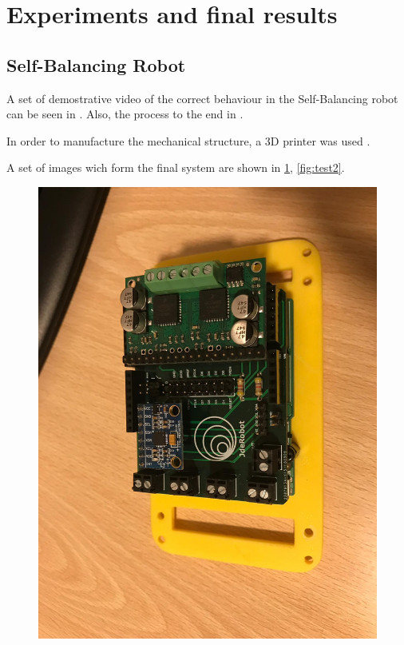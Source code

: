 \section{Experiments and final results}
\subsection{Self-Balancing Robot}
\newline 
A set of demostrative video of the correct behaviour in the Self-Balancing robot can be seen in \cite{self2}. Also, the process to the end in \cite{self1} \cite{self3}.\newline

In order to manufacture the mechanical structure, a 3D printer was used \cite{print1}.

A set of images wich form the final system are shown in \ref{fig:test1}, \ref{fig:test2}.

\begin{center}
\begin{figure}[H]
	\center
	\includegraphics[scale=0.2, angle=270]{imagenes/Balancing_Robot/test1}
	\caption{}
	\label{fig:test1}
\end{figure}
\end{center}

